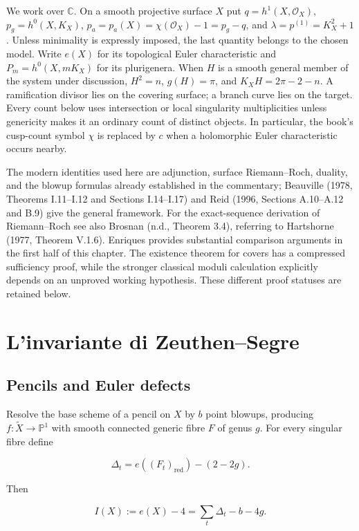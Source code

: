 We work over \(\mathbb C\). On a smooth projective surface \(X\) put \(q=h^1(X,\mathcal O_X)\), \(p_g=h^0(X,K_X)\), \(p_a=p_a(X)=\chi(\mathcal O_X)-1=p_g-q\), and \(\lambda=p^{(1)}=K_X^2+1\). Unless minimality is expressly imposed, the last quantity belongs to the chosen model. Write \(e(X)\) for its topological Euler characteristic and \(P_m=h^0(X,mK_X)\) for its plurigenera. When \(H\) is a smooth general member of the system under discussion, \(H^2=n\), \(g(H)=\pi\), and \(K_X H=2\pi-2-n\). A ramification divisor lies on the covering surface; a branch curve lies on the target. Every count below uses intersection or local singularity multiplicities unless genericity makes it an ordinary count of distinct objects. In particular, the book's cusp-count symbol \(\chi\) is replaced by \(c\) when a holomorphic Euler characteristic occurs nearby.

The modern identities used here are adjunction, surface Riemann--Roch, duality, and the blowup formulas already established in the commentary; Beauville (1978, Theorems I.11--I.12 and Sections I.14--I.17) and Reid (1996, Sections A.10--A.12 and B.9) give the general framework. For the exact-sequence derivation of Riemann--Roch see also Brosnan (n.d., Theorem 3.4), referring to Hartshorne (1977, Theorem V.1.6). Enriques provides substantial comparison arguments in the first half of this chapter. The existence theorem for covers has a compressed sufficiency proof, while the stronger classical moduli calculation explicitly depends on an unproved working hypothesis. These different proof statuses are retained below.

\section{L'invariante di Zeuthen--Segre}
\label{cp1-v-1}

\subsection{Pencils and Euler defects}

Resolve the base scheme of a pencil on \(X\) by \(b\) point blowups, producing \(f:\widetilde X\to\mathbb P^1\) with smooth connected generic fibre \(F\) of genus \(g\). For every singular fibre define

\[
\Delta_t=e((F_t)_{\mathrm{red}})-(2-2g).
\]

Then

\[
I(X):=e(X)-4=\sum_t\Delta_t-b-4g. \tag{V.1.1}
\]

